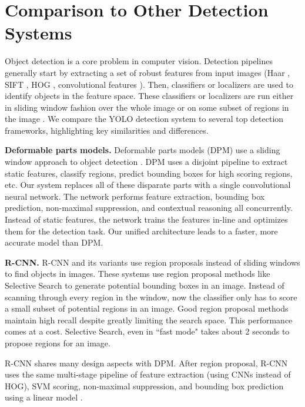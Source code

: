 \documentclass{article} %
\begin{document}
\section{Comparison to Other Detection Systems}

Object detection is a core problem in computer vision. Detection pipelines generally start by extracting a set of robust features from input images (Haar \cite{papageorgiou1998general}, SIFT \cite{lowe1999object}, HOG \cite{dalal2005histograms}, convolutional features \cite{donahue2013decaf}). Then, classifiers \cite{viola2001robust,lienhart2002extended,girshick2014rich,lsvm-pami} or localizers \cite{blaschko2008learning,DBLP:journals/corr/SermanetEZMFL13} are used to identify objects in the feature space. These classifiers or localizers are run either in sliding window fashion over the whole image or on some subset of regions in the image \cite{uijlings2013selective,gould2009region,zitnick2014edge}. We compare the YOLO detection system to several top detection frameworks, highlighting key similarities and differences.

\textbf{Deformable parts models.} Deformable parts models (DPM) use a sliding window approach to object detection \cite{lsvm-pami}. DPM uses a disjoint pipeline to extract static features, classify regions, predict bounding boxes for high scoring regions, etc. Our system replaces all of these disparate parts with a single convolutional neural network. The network performs feature extraction, bounding box prediction, non-maximal suppression, and contextual reasoning all concurrently. Instead of static features, the network trains the features in-line and optimizes them for the detection task. Our unified architecture leads to a faster, more accurate model than DPM.

\textbf{R-CNN.} R-CNN and its variants use region proposals instead of sliding windows to find objects in images. These systems use region proposal methods like Selective Search \cite{uijlings2013selective} to generate potential bounding boxes in an image. Instead of scanning through every region in the window, now the classifier only has to score a small subset of potential regions in an image. Good region proposal methods maintain high recall despite greatly limiting the search space. This performance comes at a cost. Selective Search, even in ``fast mode" takes about 2 seconds to propose regions for an image.

R-CNN shares many design aspects with DPM. After region proposal, R-CNN uses the same multi-stage pipeline of feature extraction (using CNNs instead of HOG), SVM scoring, non-maximal suppression, and bounding box prediction using a linear model \cite{girshick2014rich}. 
\end{document}
